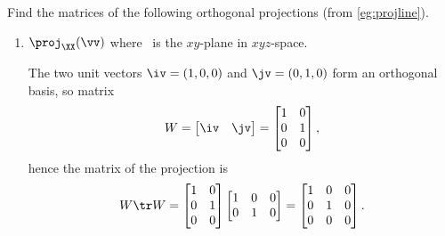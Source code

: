 \begin{example} \label{eg:}
Find the matrices of the following orthogonal projections (from \autoref{eg:projline}).
\begin{enumerate}
\item \(\proj_\XX(\vv)\) where \XX\ is the \(xy\)-plane in \(xyz\)-space.
\begin{solution} 
The two unit vectors \(\iv=(1,0,0)\) and \(\jv=(0,1,0)\) form an orthogonal basis, so matrix
\begin{equation*}
W=\begin{bmatrix} \iv&\jv \end{bmatrix}
=\begin{bmatrix} 1&0\\0&1\\0&0 \end{bmatrix},
\end{equation*}
hence the matrix of the projection is
\begin{equation*}
W\tr W=\begin{bmatrix} 1&0\\0&1\\0&0 \end{bmatrix}
\begin{bmatrix} 1&0&0\\0&1&0 \end{bmatrix}
=\begin{bmatrix} 1&0&0\\0&1&0\\0&0&0 \end{bmatrix}.
\end{equation*}
\end{solution}


\end{enumerate}
\end{example}
